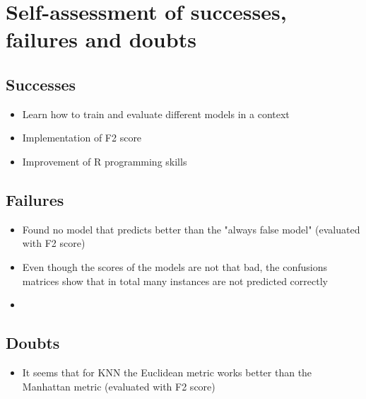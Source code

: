 
\section{Self-assessment of successes, failures and doubts}
\subsection{Successes}
\begin{itemize}
\item{Learn how to train and evaluate different models in a context}
\item{Implementation of F2 score}
\item{Improvement of R programming skills}
\end{itemize}

\subsection{Failures}
\begin{itemize}
\item{Found no model that predicts better than the "always false model" (evaluated with F2 score)}
\item{Even though the scores of the models are not that bad, the confusions matrices show that in total many instances are not predicted correctly}
\item {}
\end{itemize}

\subsection{Doubts}
\begin{itemize}
\item{It seems that for KNN the Euclidean metric works better than the Manhattan metric (evaluated with F2 score)}
\end{itemize}
